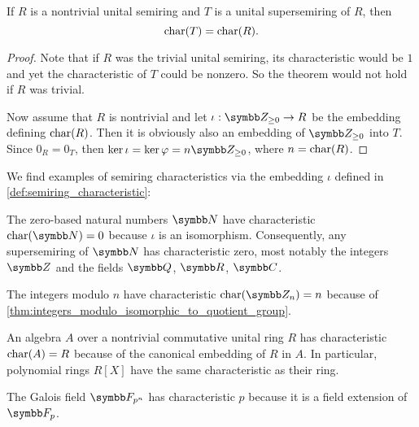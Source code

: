 \begin{proposition}\label{thm:embedding_preserves_characteristic}
  If \( R \) is a nontrivial unital semiring and \( T \) is a unital supersemiring of \( R \), then
  \begin{equation*}
    \operatorname{char}(T) = \operatorname{char}(R).
  \end{equation*}
\end{proposition}
\begin{proof}
  Note that if \( R \) was the trivial unital semiring, its characteristic would be \( 1 \) and yet the characteristic of \( T \) could be nonzero. So the theorem would not hold if \( R \) was trivial.

  Now assume that \( R \) is nontrivial and let \( \iota: \Z_{\geq 0} \to R \) be the embedding defining \( \operatorname{char}(R) \). Then it is obviously also an embedding of \( \Z_{\geq 0} \) into \( T \). Since \( 0_R = 0_T \), then \( \ker \iota = \ker \varphi = n\Z_{\geq 0} \), where \( n = \operatorname{char}(R) \).
\end{proof}

\begin{example}\label{ex:semiring_characteristic}
  We find examples of semiring characteristics via the embedding \( \iota \) defined in \cref{def:semiring_characteristic}:

  \begin{exenum}
     The zero-based natural numbers \( \N \) have characteristic \( \Char(\N) = 0 \) because \( \iota \) is an isomorphism. Consequently, any supersemiring of \( \N \) has characteristic zero, most notably the integers \( \Z \) and the fields \( \Q \), \( \R \), \( \C \).

     The integers modulo \( n \) have characteristic \( \Char(\Z_n) = n \) because of \cref{thm:integers_modulo_isomorphic_to_quotient_group}.

     An algebra \( A \) over a nontrivial commutative unital ring \( R \) has characteristic \( \operatorname{char}(A) = R \) because of the canonical embedding of \( R \) in \( A \). In particular, polynomial rings \( R[X] \) have the same characteristic as their ring.

     The Galois field \( \F_{p^n} \) has characteristic \( p \) because it is a field extension of \( \F_p \).
  \end{exenum}
\end{example}

